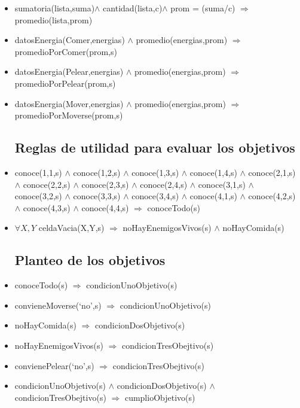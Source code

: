 \begin{itemize}
\item sumatoria(lista,suma)$\land$ cantidad(lista,c)$\land$ prom = (suma/c)
\newline
       $\Rightarrow$ promedio(lista,prom)

\item  datosEnergia(Comer,energias) $\land$ 
 promedio(energias,prom) $\Rightarrow$
 promedioPorComer(prom,s)
       
\item  datosEnergia(Pelear,energias) $\land$ 
 promedio(energias,prom) $\Rightarrow$
 promedioPorPelear(prom,s)

\item  datosEnergia(Mover,energias) $\land$ 
 promedio(energias,prom) $\Rightarrow$
 promedioPorMoverse(prom,s)

\subsection{Reglas de utilidad para evaluar los objetivos}

\item conoce(1,1,s) $\land$ conoce(1,2,s) $\land$ 
 conoce(1,3,s) $\land$ conoce(1,4,s) $\land$ 
 \newline 
 conoce(2,1,s) $\land$ conoce(2,2,s) $\land$ 
 conoce(2,3,s) $\land$ conoce(2,4,s) $\land$ 
 \newline 
 conoce(3,1,s) $\land$ conoce(3,2,s) $\land$ 
 conoce(3,3,s) $\land$ conoce(3,4,s) $\land$ 
 \newline 
 conoce(4,1,s) $\land$ conoce(4,2,s) $\land$ 
 conoce(4,3,s) $\land$ conoce(4,4,s) 
 \newline
 $\Rightarrow$ conoceTodo(s)
 
\item $\forall X,Y$ celdaVacia(X,Y,s) 
 $\Rightarrow$ noHayEnemigosVivos(s) $\land$ noHayComida(s)

\subsection{Planteo de los objetivos}
\item conoceTodo(s) $\Rightarrow$ condicionUnoObjetivo(s)

\item convieneMoverse(`no',s) $\Rightarrow$ condicionUnoObjetivo(s)

\item noHayComida(s) $\Rightarrow$ condicionDosObjetivo(s)
\item noHayEnemigosVivos(s) $\Rightarrow$ condicionTresObejtivo(s)
\item convienePelear(`no',s) $\Rightarrow$ condicionTresObejtivo(s)

\item  condicionUnoObjetivo(s) $\land$ condicionDosObjetivo(s)
$\land$ condicionTresObejtivo(s) $\Rightarrow$ cumplioObjetivo(s)

\end{itemize}


